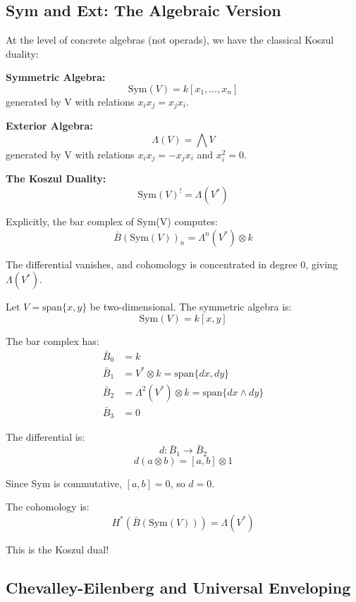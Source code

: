 \subsection{Sym and Ext: The Algebraic Version}

\begin{example}\label{ex:sym-ext-classical}
At the level of concrete algebras (not operads), we have the classical Koszul duality:

\textbf{Symmetric Algebra:}
$$\text{Sym}(V) = k[x_1, \ldots, x_n]$$
generated by V with relations $x_i x_j = x_j x_i$.

\textbf{Exterior Algebra:}
$$\Lambda(V) = \bigwedge V$$
generated by V with relations $x_i x_j = -x_j x_i$ and $x_i^2 = 0$.

\textbf{The Koszul Duality:}
$$\text{Sym}(V)^! = \Lambda(V^*)$$

Explicitly, the bar complex of Sym(V) computes:
$$\bar{B}(\text{Sym}(V))_n = \Lambda^n(V^*) \otimes k$$

The differential vanishes, and cohomology is concentrated in degree 0, giving $\Lambda(V^*)$.
\end{example}

\begin{computation}\label{comp:sym-bar}
Let $V = \text{span}\{x, y\}$ be two-dimensional. The symmetric algebra is:
$$\text{Sym}(V) = k[x,y]$$

The bar complex has:
\begin{align*}
\bar{B}_0 &= k \\
\bar{B}_1 &= V^* \otimes k = \text{span}\{dx, dy\} \\
\bar{B}_2 &= \Lambda^2(V^*) \otimes k = \text{span}\{dx \wedge dy\} \\
\bar{B}_3 &= 0
\end{align*}

The differential is:
$$d: \bar{B}_1 \to \bar{B}_2$$
$$d(a \otimes b) = [a,b] \otimes 1$$

Since Sym is commutative, $[a,b] = 0$, so $d = 0$.

The cohomology is:
$$H^*(\bar{B}(\text{Sym}(V))) = \Lambda(V^*)$$

This is the Koszul dual!
\end{computation}

\subsection{Chevalley-Eilenberg and Universal Enveloping}

